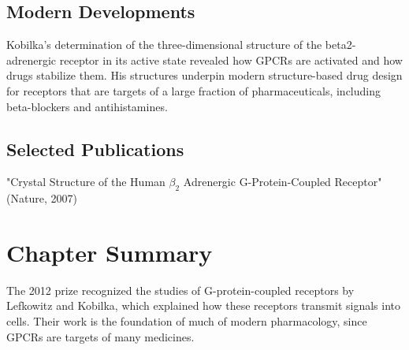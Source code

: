 \subsection*{Modern Developments}

Kobilka's determination of the three-dimensional structure of the beta2-adrenergic receptor in its active state revealed how GPCRs are activated and how drugs stabilize them. His structures underpin modern structure-based drug design for receptors that are targets of a large fraction of pharmaceuticals, including beta-blockers and antihistamines.

\subsection*{Selected Publications}

"Crystal Structure of the Human $\beta_{2}$ Adrenergic G-Protein-Coupled Receptor" (Nature, 2007)

\clearpage

\section*{Chapter Summary}

The 2012 prize recognized the studies of G-protein-coupled receptors by Lefkowitz and Kobilka, which explained how these receptors transmit signals into cells. Their work is the foundation of much of modern pharmacology, since GPCRs are targets of many medicines.
